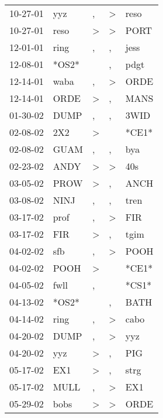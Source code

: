 \begin{supertabular}{lllll}
 10-27-01 &    yyz &                , &     \textgreater &   reso \\
 10-27-01 &   reso &     \textgreater &     \textgreater &   PORT \\
 12-01-01 &   ring &                , &                , &   jess \\
 12-08-01 &  *OS2* &                  &                , &   pdgt \\
 12-14-01 &   waba &                , &     \textgreater &   ORDE \\
 12-14-01 &   ORDE &     \textgreater &                , &   MANS \\
 01-30-02 &   DUMP &                , &                , &   3WID \\
 02-08-02 &    2X2 &     \textgreater &                  &  *CE1* \\
 02-08-02 &   GUAM &                , &                , &    bya \\
 02-23-02 &   ANDY &     \textgreater &     \textgreater &    40s \\
 03-05-02 &   PROW &     \textgreater &                , &   ANCH \\
 03-08-02 &   NINJ &                , &                , &   tren \\
 03-17-02 &   prof &                , &     \textgreater &    FIR \\
 03-17-02 &    FIR &     \textgreater &                , &   tgim \\
 04-02-02 &    sfb &                , &     \textgreater &   POOH \\
 04-02-02 &   POOH &     \textgreater &                  &  *CE1* \\
 04-05-02 &   fwll &                , &                  &  *CS1* \\
 04-13-02 &  *OS2* &                  &                , &   BATH \\
 04-14-02 &   ring &                , &     \textgreater &   cabo \\
 04-20-02 &   DUMP &                , &     \textgreater &    yyz \\
 04-20-02 &    yyz &     \textgreater &                , &    PIG \\
 05-17-02 &    EX1 &     \textgreater &                , &   strg \\
 05-17-02 &   MULL &                , &     \textgreater &    EX1 \\
 05-29-02 &   bobs &     \textgreater &     \textgreater &   ORDE \\

\end{supertabular}
